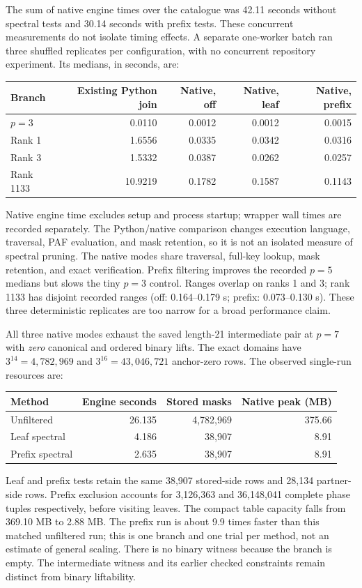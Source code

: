 \documentclass[11pt]{article}
\begin{document}
The sum of native engine times over the catalogue was
42.11 seconds without spectral tests and
30.14 seconds with prefix tests. These concurrent
measurements do not isolate timing effects. A separate one-worker batch
ran three shuffled replicates per configuration, with no concurrent
repository experiment. Its medians, in seconds, are:
\begin{center}
\begin{tabular}{lrrrr}
\toprule
Branch & Existing Python join & Native, off & Native, leaf & Native, prefix\\
\midrule
$p=3$ & 0.0110 & 0.0012 & 0.0012 & 0.0015\\
Rank 1 & 1.6556 & 0.0335 & 0.0342 & 0.0316\\
Rank 3 & 1.5332 & 0.0387 & 0.0262 & 0.0257\\
Rank 1133 & 10.9219 & 0.1782 & 0.1587 & 0.1143\\
\bottomrule
\end{tabular}
\end{center}
Native engine time excludes setup and process startup; wrapper wall times
are recorded separately. The Python/native comparison changes execution
language, traversal, PAF evaluation, and mask retention, so it is not an
isolated measure of spectral pruning. The native modes share traversal,
full-key lookup, mask retention, and exact verification. Prefix filtering
improves the recorded $p=5$ medians but slows the tiny $p=3$ control.
Ranges overlap on ranks 1 and 3; rank 1133 has disjoint recorded ranges
(off: 0.164--0.179 s; prefix: 0.073--0.130 s). These three deterministic
replicates are too narrow for a broad performance claim.

All three native modes exhaust the saved length-21 intermediate pair at
$p=7$ with \emph{zero} canonical and ordered binary lifts. The exact domains
have $3^{14}=4{,}782{,}969$ and $3^{16}=43{,}046{,}721$ anchor-zero rows.
The observed single-run resources are:
\begin{center}
\begin{tabular}{lrrr}
\toprule
Method & Engine seconds & Stored masks & Native peak (MB)\\
\midrule
Unfiltered & 26.135 & 4,782,969 & 375.66\\
Leaf spectral & 4.186 & 38,907 & 8.91\\
Prefix spectral & 2.635 & 38,907 & 8.91\\
\bottomrule
\end{tabular}
\end{center}
Leaf and prefix tests retain the same 38,907 stored-side rows and 28,134
partner-side rows. Prefix exclusion accounts for 3,126,363 and 36,148,041
complete phase tuples respectively, before visiting leaves. The compact
table capacity falls from 369.10 MB to 2.88 MB. The prefix run is about
9.9 times faster than this matched unfiltered run; this is one branch and
one trial per method, not an estimate of general scaling. There is no
binary witness because the branch is empty. The intermediate witness and
its earlier checked constraints remain distinct from binary liftability.
\end{document}
